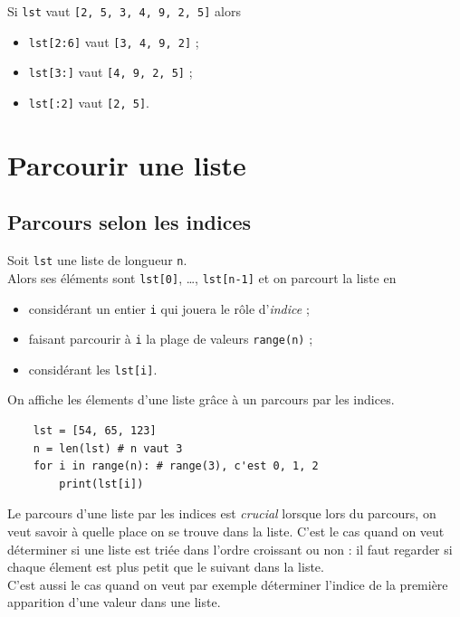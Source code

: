 \begin{exemple}[]
	Si \texttt{lst} vaut \texttt{[2, 5, 3, 4, 9, 2, 5]} alors
	\begin{itemize}
		\item \texttt{lst[2:6]} vaut \texttt{[3, 4, 9, 2]} ;
		\item \texttt{lst[3:]} vaut \texttt{[4, 9, 2, 5]} ;
		\item \texttt{lst[:2]} vaut \texttt{[2, 5]}.
	\end{itemize}
\end{exemple}




\section{Parcourir une liste}
\subsection{Parcours selon les indices}

\begin{definition}
	Soit \texttt{lst} une liste de longueur \texttt{n}.\\

	Alors ses éléments sont \texttt{lst[0]}, \ldots, \texttt{lst[n-1]} et on parcourt la liste en
	\begin{itemize}
		\item considérant un entier \texttt{i} qui jouera le rôle d'\textit{indice} ;
		\item faisant parcourir à \texttt{i} la plage de valeurs \texttt{range(n)} ;
		\item considérant les \texttt{lst[i]}.
	\end{itemize}
\end{definition}
\begin{exemple}
	On affiche les élements d'une liste grâce à un parcours par les indices.
	\begin{verbatim}
	lst = [54, 65, 123]
	n = len(lst) # n vaut 3
	for i in range(n): # range(3), c'est 0, 1, 2
		print(lst[i])
	\end{verbatim}
\end{exemple}

Le parcours d'une liste par les indices est \textit{crucial} lorsque lors du parcours, on veut savoir à quelle place on se trouve dans la liste. C'est le cas quand on veut déterminer si une liste est triée dans l'ordre croissant ou non : il faut regarder si chaque élement est plus petit que le suivant dans la liste.\\
C'est aussi le cas quand on veut par exemple déterminer l'indice de la première apparition d'une valeur dans une liste.


